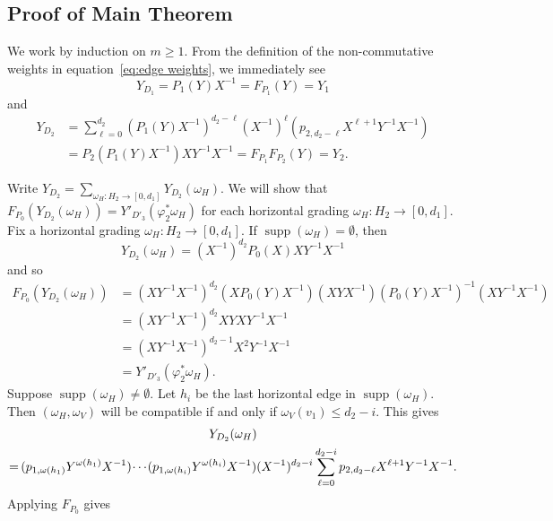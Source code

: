 \documentclass[10pt]{amsart}
\theoremstyle{definition}
\DeclareMathOperator{\supp}{supp}
\newcommand*{\Mk}{\mkern -2mu}
\begin{document}
\subsection{Proof of Main Theorem}
We work by induction on $m\ge1$.
From the definition of the non-commutative weights in equation~\eqref{eq:edge weights}, we immediately see 
\[Y_{D_1}=P_1(Y)X^{-1}=F_{P_1}(Y)=Y_1\]
and
\begin{align*}
 Y_{D_2}
 &=\sum\limits_{\ell=0}^{d_2} (P_1(Y)X^{-1})^{d_2-\ell}(X^{-1})^\ell(p_{2,d_2-\ell}X^{\ell+1}Y^{-1}X^{-1})\\
 &=P_2(P_1(Y)X^{-1})XY^{-1}X^{-1}=F_{P_1}F_{P_2}(Y)=Y_2.
\end{align*}

Write $Y_{D_2}=\sum\limits_{\omega_H:H_2\to[0,d_1]} Y_{D_2}(\omega_H)$.
We will show that $F_{P_0}(Y_{D_2}(\omega_H))=Y'_{D'_3}(\varphi^*_2\omega_H)$ for each horizontal grading $\omega_H:H_2\to[0,d_1]$.
Fix a horizontal grading $\omega_H:H_2\to[0,d_1]$.
If $\supp(\omega_H)=\emptyset$, then 
\[Y_{D_2}(\omega_H)=(X^{-1})^{d_2}P_0(X)XY^{-1}X^{-1}\]
and so 
\begin{align*}
 F_{P_0}(Y_{D_2}(\omega_H))
 &=(XY^{-1}X^{-1})^{d_2}(XP_0(Y)X^{-1})(XYX^{-1})(P_0(Y)X^{-1})^{-1}(XY^{-1}X^{-1})\\
 &=(XY^{-1}X^{-1})^{d_2}XYXY^{-1}X^{-1}\\
 &=(XY^{-1}X^{-1})^{d_2-1}X^2Y^{-1}X^{-1}\\
 &=Y'_{D'_3}(\varphi^*_2\omega_H).
\end{align*}
Suppose $\supp(\omega_H)\ne\emptyset$.
Let $h_i$ be the last horizontal edge in $\supp(\omega_H)$.
Then $(\omega_H,\omega_V)$ will be compatible if and only if $\omega_V(v_1)\le d_2-i$.
This gives
\begin{multline*}
Y_{D_2}(\omega_H)\\
=\Mk (p_{1,\omega(h_1)}Y^{\omega(h_1)}X^{-1})\Mk \cdots\Mk (p_{1,\omega(h_i)}Y^{\omega(h_i)}X^{-1})(X^{-1})^{d_2-i}\sum\limits_{\ell=0}^{d_2-i} p_{2,d_2-\ell}X^{\ell+1}Y^{-1}X^{-1}.
\end{multline*}
Applying $F_{P_0}$ gives
\end{document}
